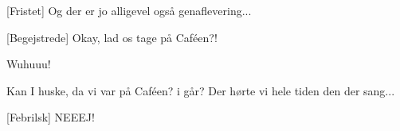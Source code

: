 \documentclass[a4paper,11pt]{article}
\begin{document}
\begin{sketch}
[Fristet] Og der er jo alligevel også genaflevering...

[Begejstrede] Okay, lad os tage på Caféen?!

 Wuhuuu!


 Kan I huske, da vi var på Caféen? i går? Der hørte vi hele tiden den der sang...

[Febrilsk] NEEEJ!


\end{sketch}
\end{document}
